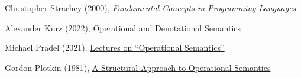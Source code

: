 \documentclass{article}
\begin{document}


\plush{}


Christopher Strachey (2000),
\emph{Fundamental Concepts in Programming Languages}

Alexander Kurz (2022),
\href{https://hackmd.io/@alexhkurz/Hkf6BTL6P}{Operational and Denotational Semantics}

Michael Pradel (2021),
\href{https://www.youtube.com/watch?v=jsBHd3-04oA}{Lectures on ``Operational Semantics''}

Gordon Plotkin (1981),
\href{https://web.eecs.umich.edu/~weimerw/2006-615/reading/plotkin81structural.pdf}{A Structural Approach to Operational Semantics}
\end{document}
